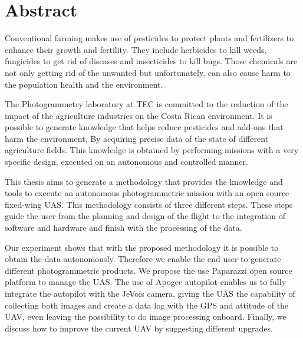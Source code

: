 \section{Abstract}
Conventional farming makes use of pesticides to protect plants and fertilizers to enhance their growth and fertility. They include herbicides to kill weeds, fungicides to get rid of diseases and insecticides to kill bugs. Those chemicals are not only getting rid of the unwanted but unfortunately, can also cause harm to the population health and the environment.

The  Photogrammetry laboratory at TEC is committed to the reduction of the impact of the agriculture industries on the Costa Rican environment. It is possible to generate knowledge that helps reduce pesticides and add-ons that harm the environment, By acquiring precise data of the state of different agriculture fields. This knowledge is obtained by performing missions with a  very specific design, executed on an autonomous and controlled manner.


This thesis aims to generate a methodology that provides the knowledge and tools to execute an autonomous photogrammetric mission with an open source fixed-wing UAS.  This methodology consists of three different steps. These steps guide the user from the planning and design of the flight to the integration of software and hardware and finish with the processing of the data.

Our experiment shows that with the proposed methodology it is possible to obtain the data autonomously. Therefore we enable the end user to generate different photogrammetric products. We propose the use  Paparazzi open source platform to manage the UAS. The use of Apogee autopilot enables us to fully integrate the autopilot with the JeVois camera, giving the UAS the capability of collecting both images and create a data log with the GPS and attitude of the UAV, even leaving the possibility to do image processing onboard.
Finally, we discuss how to improve the current UAV by suggesting different upgrades.